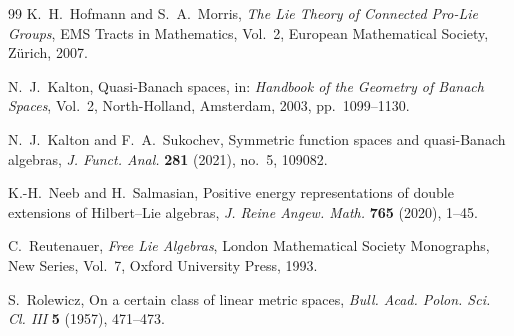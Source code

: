 \documentclass[10pt]{amsart}
\theoremstyle{definition}
\theoremstyle{remark}
\numberwithin{equation}{section}
\begin{document}
\begin{thebibliography}{99}
K.~H.~Hofmann and S.~A.~Morris,
\textit{The Lie Theory of Connected Pro-Lie Groups},
EMS Tracts in Mathematics, Vol.~2, European Mathematical Society, Z\"urich, 2007.

N.~J.~Kalton,
Quasi-Banach spaces,
in: \textit{Handbook of the Geometry of Banach Spaces}, Vol.~2,
North-Holland, Amsterdam, 2003, pp.~1099--1130.

N.~J.~Kalton and F.~A.~Sukochev,
Symmetric function spaces and quasi-Banach algebras,
\textit{J. Funct. Anal.} \textbf{281} (2021), no.~5, 109082.

K.-H.~Neeb and H.~Salmasian,
Positive energy representations of double extensions of Hilbert--Lie algebras,
\textit{J. Reine Angew. Math.} \textbf{765} (2020), 1--45.

C.~Reutenauer,
\textit{Free Lie Algebras},
London Mathematical Society Monographs, New Series, Vol.~7,
Oxford University Press, 1993.

S.~Rolewicz,
On a certain class of linear metric spaces,
\textit{Bull. Acad. Polon. Sci. Cl. III} \textbf{5} (1957), 471--473.

\end{thebibliography}
\end{document}
